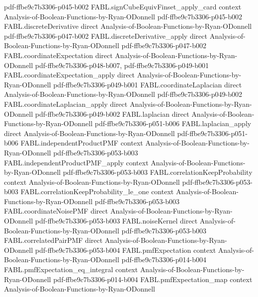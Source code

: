 \begin{theorem}
  {pdf-ffbe9c7b3306-p045-b002}
\proofstep
  {FABL.signCubeEquivFinset_apply_card}
  {context}
  {Analysis-of-Boolean-Functions-by-Ryan-ODonnell}
  {pdf-ffbe9c7b3306-p045-b002}
\proofstep
  {FABL.discreteDerivative}
  {direct}
  {Analysis-of-Boolean-Functions-by-Ryan-ODonnell}
  {pdf-ffbe9c7b3306-p047-b002}
\proofstep
  {FABL.discreteDerivative_apply}
  {direct}
  {Analysis-of-Boolean-Functions-by-Ryan-ODonnell}
  {pdf-ffbe9c7b3306-p047-b002}
\proofstep
  {FABL.coordinateExpectation}
  {direct}
  {Analysis-of-Boolean-Functions-by-Ryan-ODonnell}
  {pdf-ffbe9c7b3306-p048-b007,
    pdf-ffbe9c7b3306-p049-b001}
\proofstep
  {FABL.coordinateExpectation_apply}
  {direct}
  {Analysis-of-Boolean-Functions-by-Ryan-ODonnell}
  {pdf-ffbe9c7b3306-p049-b001}
\proofstep
  {FABL.coordinateLaplacian}
  {direct}
  {Analysis-of-Boolean-Functions-by-Ryan-ODonnell}
  {pdf-ffbe9c7b3306-p049-b002}
\proofstep
  {FABL.coordinateLaplacian_apply}
  {direct}
  {Analysis-of-Boolean-Functions-by-Ryan-ODonnell}
  {pdf-ffbe9c7b3306-p049-b002}
\proofstep
  {FABL.laplacian}
  {direct}
  {Analysis-of-Boolean-Functions-by-Ryan-ODonnell}
  {pdf-ffbe9c7b3306-p051-b006}
\proofstep
  {FABL.laplacian_apply}
  {direct}
  {Analysis-of-Boolean-Functions-by-Ryan-ODonnell}
  {pdf-ffbe9c7b3306-p051-b006}
\proofstep
  {FABL.independentProductPMF}
  {context}
  {Analysis-of-Boolean-Functions-by-Ryan-ODonnell}
  {pdf-ffbe9c7b3306-p053-b003}
\proofstep
  {FABL.independentProductPMF_apply}
  {context}
  {Analysis-of-Boolean-Functions-by-Ryan-ODonnell}
  {pdf-ffbe9c7b3306-p053-b003}
\proofstep
  {FABL.correlationKeepProbability}
  {context}
  {Analysis-of-Boolean-Functions-by-Ryan-ODonnell}
  {pdf-ffbe9c7b3306-p053-b003}
\proofstep
  {FABL.correlationKeepProbability_le_one}
  {context}
  {Analysis-of-Boolean-Functions-by-Ryan-ODonnell}
  {pdf-ffbe9c7b3306-p053-b003}
\proofstep
  {FABL.coordinateNoisePMF}
  {direct}
  {Analysis-of-Boolean-Functions-by-Ryan-ODonnell}
  {pdf-ffbe9c7b3306-p053-b003}
\proofstep
  {FABL.noiseKernel}
  {direct}
  {Analysis-of-Boolean-Functions-by-Ryan-ODonnell}
  {pdf-ffbe9c7b3306-p053-b003}
\proofstep
  {FABL.correlatedPairPMF}
  {direct}
  {Analysis-of-Boolean-Functions-by-Ryan-ODonnell}
  {pdf-ffbe9c7b3306-p053-b004}
\proofstep
  {FABL.pmfExpectation}
  {context}
  {Analysis-of-Boolean-Functions-by-Ryan-ODonnell}
  {pdf-ffbe9c7b3306-p014-b004}
\proofstep
  {FABL.pmfExpectation_eq_integral}
  {context}
  {Analysis-of-Boolean-Functions-by-Ryan-ODonnell}
  {pdf-ffbe9c7b3306-p014-b004}
\proofstep
  {FABL.pmfExpectation_map}
  {context}
  {Analysis-of-Boolean-Functions-by-Ryan-ODonnell}

\end{theorem}

